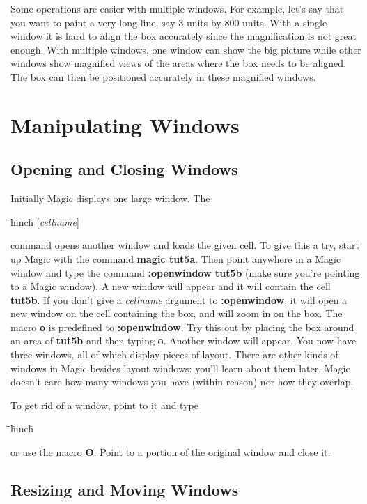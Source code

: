 \documentclass[letterpaper,twoside,12pt]{article}
\def\hinch{\hspace*{0.5in}}
\def\starti{\begin{center}\begin{tabbing}\hinch\=\hinch\=\hinch\=hinch\hinch\=\kill}
\def\endi{\end{tabbing}\end{center}}
\def\ii{\>\>\>}
\begin{document}
Some operations are easier with multiple
windows.  For example, let's say that you want to paint a very long line,
say 3 units by 800 units.  With a single window it is hard to align
the box accurately since the magnification is not great enough.
With multiple windows, one window can show the big
picture while other windows show magnified views of the areas where the
box needs to be aligned.  The box can then be positioned accurately
in these magnified windows.

\section{Manipulating Windows}

\subsection{Opening and Closing Windows}

Initially Magic displays one large window.  The 

\starti
   \ii {\bfseries :openwindow }[{\itshape cellname}]
\endi

command opens another window and loads the given cell.  To give
this a try, start up Magic with the command {\bfseries magic tut5a}.
Then point anywhere in a Magic window and type the command
{\bfseries :openwindow tut5b} (make sure you're pointing to a
Magic window).  A new window will appear and it will
contain the cell {\bfseries tut5b}.  If you don't
give a {\itshape cellname} argument to {\bfseries :openwindow}, it will
open a new window on the cell containing the box, and will zoom
in on the box.  The macro {\bfseries o} is predefined to {\bfseries :openwindow}.
Try this
out by placing the box around an area of {\bfseries tut5b} and then
typing {\bfseries o}.  Another window will appear.  You now have
three windows, all of which display pieces of layout.  There
are other kinds of windows in Magic besides layout windows:  you'll
learn about them later.  Magic doesn't care how many windows
you have (within reason) nor how they overlap.

To get rid of a window, point to it and type

\starti
   \ii {\bfseries :closewindow}
\endi

or use the macro {\bfseries O}.
Point to a portion of the original window and close it.  

\subsection{Resizing and Moving Windows}
\end{document}
